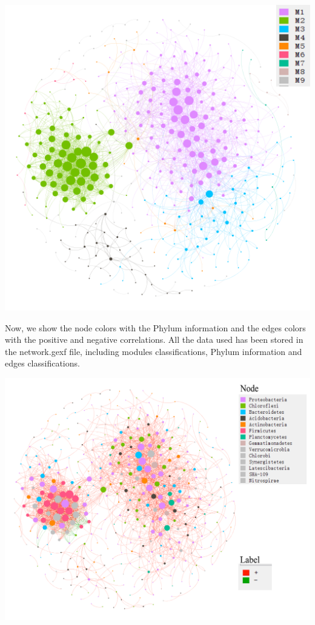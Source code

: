 \documentclass[
]{book}
\begin{document}
\begin{center}\includegraphics[width=550px]{Images/network1_spearman} \end{center}

Now, we show the node colors with the Phylum information and the edges colors with the positive and negative correlations.
All the data used has been stored in the network.gexf file, including modules classifications, Phylum information and edges classifications.

\begin{center}\includegraphics[width=550px]{Images/network2_spearman} \end{center}
\end{document}
